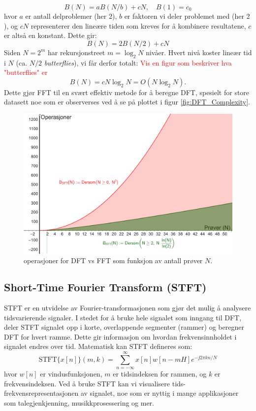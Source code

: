 \[
    B(N) = aB(N/b) + cN, \quad B(1) = c_0
\]
hvor $a$ er antall delproblemer (her $2$), $b$ er faktoren vi deler problemet med (her $2$), og $cN$ representerer den lineære tiden som kreves for å kombinere resultatene, $c$ er altså en konstant. Dette gir:
\[
    B(N) = 2B(N/2) + cN
\]
Siden $N=2^m$ har rekursjonstreet $m=\log_2 N$ nivåer. Hvert nivå koster lineær tid i $N$ (ca. $N/2$ \emph{butterflies}), vi får derfor totalt:
\textcolor{red}{Vis en figur som beskriver hva "butterflies" er}
\[
    B(N)=cN\log_2 N=O(N\log_2 N).
\]
Dette gjør FFT til en svært effektiv metode for å beregne DFT, spesielt for store datasett noe som er observerses ved å se på plottet i figur \ref{fig:DFT_Complexity}.
\begin{figure}[h]
    \centering
    \includegraphics[width=.9\textwidth]{./Media/DFT_Complexity_VS_FFT.png}
    \caption{operasjoner for DFT vs FFT som funksjon av antall prøver $N$.}
    \label{fig:FFT_Complexity}
\end{figure}
\clearpage 
\noindent
\subsection{Short-Time Fourier Transform (STFT)}
STFT er en utvidelse av Fourier-transformasjonen som gjør det mulig å analysere tidsvarierende signaler. I stedet for å bruke hele signalet som inngang til DFT, deler STFT signalet opp i korte, overlappende segmenter (rammer) og beregner DFT for hvert ramme. Dette gir informasjon om hvordan frekvensinnholdet i signalet endres over tid. Matematisk kan STFT defineres som:
\[
    \text{STFT}\{x[n]\}(m, k) = \sum_{n=-\infty}^{\infty} x[n] w[n - mH] e^{-\jj 2 \pi k n / N}
\]
hvor \(w[n]\) er vindusfunksjonen, \(m\) er tidsindeksen for rammen, og \(k\) er frekvensindeksen. Ved å bruke STFT kan vi visualisere tids-frekvensrepresentasjonen av signalet, noe som er nyttig i mange applikasjoner som talegjenkjenning, musikkprosessering og mer.


